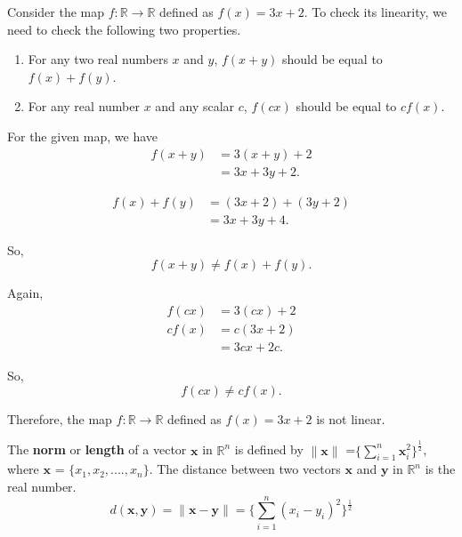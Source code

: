 \begin{example}
    Consider the map $f:\mathbb{R} \to \mathbb{R}$ defined as $f(x) = 3x+2$. To check its linearity, we need to check the following two properties.
\begin{enumerate}
    \item  For any two real numbers $x$ and $y$, $f(x+y)$ should be equal to $f(x)+f(y)$.
    \item For any real number $x$ and any scalar $c$, $f(cx)$ should be equal to $cf(x)$.
\end{enumerate}
For the given map, we have
\[
\begin{aligned}
    f(x+y) &= 3(x+y) + 2 \\
           &= 3x + 3y + 2.
\end{aligned}
\]

\[
\begin{aligned}
    f(x) + f(y) &= (3x + 2) + (3y + 2) \\
              &= 3x + 3y + 4.
\end{aligned}
\]

So, \[f(x+y) \neq f(x) + f(y).\]

Again,
\[
\begin{aligned}
    f(cx) &= 3(cx) + 2 \\
    cf(x) &= c(3x + 2) \\
          &= 3cx + 2c.
\end{aligned}
\]

So, \[f(cx) \neq cf(x).\]

Therefore, the map \(f: \mathbb{R} \to \mathbb{R}\) defined as $f(x) = 3x + 2$ is not linear.
\end{example}



\begin{definition}
The \textbf{ norm } or \textbf{ length } of a vector $\mathbf{x}$ in $\mathbb{R}^n$ is defined by $\| \mathbf{x} \|$ =$ \{\sum_{i=1}^{n} {\mathbf{x}_i^2}  \} ^{\frac{1}{2}}$, where $\mathbf{x}$ =  $\{x_1,x_2,....,x_n\}$. The distance between two vectors $\mathbf{x}$ and $\mathbf{y}$ in $\mathbb{R}^n$ is the real number.
$$d(\mathbf{x},\mathbf{y}) =  \| \mathbf{x} - \mathbf{y} \| = \{ \sum_{i=1}^{n} {(x_i-y_i)}^2 \}^{\frac{1}{2}} $$
\end{definition}

